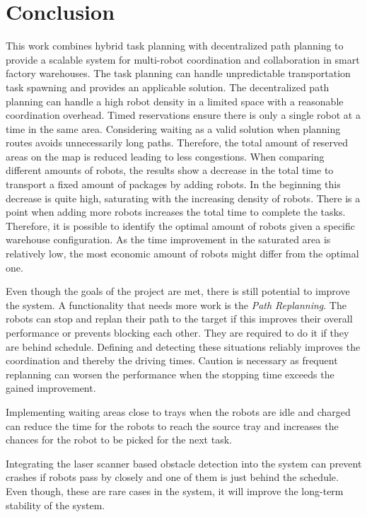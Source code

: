 \documentclass[journal]{IEEEtran}
\begin{document}
\section{Conclusion}
\label{sec:conclusion}
This work combines hybrid task planning with decentralized path planning to provide a scalable system for multi-robot coordination and collaboration in smart factory warehouses. The task planning can handle unpredictable transportation task spawning and provides an applicable solution. The decentralized path planning can handle a high robot density in a limited space with a reasonable coordination overhead. Timed reservations ensure there is only a single robot at a time in the same area. Considering waiting as a valid solution when planning routes avoids unnecessarily long paths. Therefore, the total amount of reserved areas on the map is reduced leading to less congestions. When comparing different amounts of robots, the results show a decrease in the total time to transport a fixed amount of packages by adding robots. In the beginning this decrease is quite high, saturating with the increasing density of robots. There is a point when adding more robots increases the total time to complete the tasks. Therefore, it is possible to identify the optimal amount of robots given a specific warehouse configuration. As the time improvement in the saturated area is relatively low, the most economic amount of robots might differ from the optimal one.

Even though the goals of the project are met, there is still potential to improve the system. A functionality that needs more work is the \emph{Path Replanning}. The robots can stop and replan their path to the target if this improves their overall performance or prevents blocking each other. They are required to do it if they are behind schedule. Defining and detecting these situations reliably improves the coordination and thereby the driving times. Caution is necessary as frequent replanning can worsen the performance when the stopping time exceeds the gained improvement.

Implementing waiting areas close to trays when the robots are idle and charged can reduce the time for the robots to reach the source tray and increases the chances for the robot to be picked for the next task.

Integrating the laser scanner based obstacle detection into the system can prevent crashes if robots pass by closely and one of them is just behind the schedule. Even though, these are rare cases in the system, it will improve the long-term stability of the system.
\end{document}
